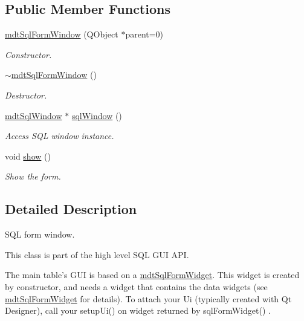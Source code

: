 \subsection*{Public Member Functions}
\begin{DoxyCompactItemize}
\item 
\hypertarget{classmdt_sql_form_window_a67149a8239b5918ef269d5ff0473813e}{
\hyperlink{classmdt_sql_form_window_a67149a8239b5918ef269d5ff0473813e}{mdtSqlFormWindow} (QObject $\ast$parent=0)}
\label{classmdt_sql_form_window_a67149a8239b5918ef269d5ff0473813e}

\begin{DoxyCompactList}\small\item\em Constructor. \end{DoxyCompactList}\item 
\hypertarget{classmdt_sql_form_window_a3399ae1660eeca90ccbf2132858d78c6}{
\hyperlink{classmdt_sql_form_window_a3399ae1660eeca90ccbf2132858d78c6}{$\sim$mdtSqlFormWindow} ()}
\label{classmdt_sql_form_window_a3399ae1660eeca90ccbf2132858d78c6}

\begin{DoxyCompactList}\small\item\em Destructor. \end{DoxyCompactList}\item 
\hyperlink{classmdt_sql_window}{mdtSqlWindow} $\ast$ \hyperlink{classmdt_sql_form_window_a5e2a976427f9bd5903176054014b4e92}{sqlWindow} ()
\begin{DoxyCompactList}\small\item\em Access SQL window instance. \end{DoxyCompactList}\item 
void \hyperlink{classmdt_sql_form_window_a659782b4223406d694f0bcd702f7c017}{show} ()
\begin{DoxyCompactList}\small\item\em Show the form. \end{DoxyCompactList}\end{DoxyCompactItemize}


\subsection{Detailed Description}
SQL form window. 

This class is part of the high level SQL GUI API.

The main table's GUI is based on a \hyperlink{classmdt_sql_form_widget}{mdtSqlFormWidget}. This widget is created by constructor, and needs a widget that contains the data widgets (see \hyperlink{classmdt_sql_form_widget}{mdtSqlFormWidget} for details). To attach your Ui (typically created with Qt Designer), call your setupUi() on widget returned by sqlFormWidget() .

